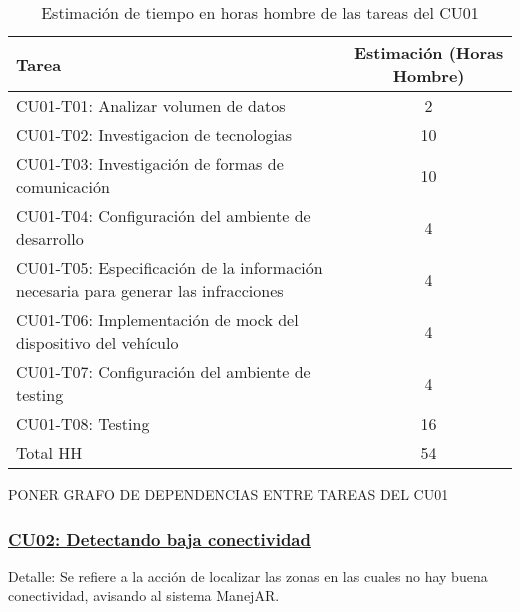 \begin{table}[htb]
\begin{center}
\begin{tabular}{|l|c|}
\hline
Tarea & Estimación (Horas Hombre) \\
\hline \hline
CU01-T01: Analizar volumen de datos & 2 \\ \hline
CU01-T02: Investigacion de tecnologias & 10 \\ \hline
CU01-T03: Investigación de formas de comunicación & 10 \\ \hline
CU01-T04: Configuración del ambiente de desarrollo & 4 \\ \hline
CU01-T05: Especificación de la información necesaria para generar las infracciones & 4 \\ \hline
CU01-T06: Implementación de mock del dispositivo del vehículo & 4 \\ \hline
CU01-T07: Configuración del ambiente de testing & 4 \\ \hline
CU01-T08: Testing & 16 \\ \hline
Total HH & 54 \\ \hline
\end{tabular}
\caption{Estimación de tiempo en horas hombre de las tareas del CU01}
\label{tabla:sencilla}
\end{center}
\end{table}


PONER GRAFO DE DEPENDENCIAS ENTRE TAREAS DEL CU01

\subsubsection{\underline{CU02: Detectando baja conectividad}}

Detalle: Se refiere a la acción de localizar las zonas en las cuales no hay buena 
conectividad, avisando al sistema ManejAR.


